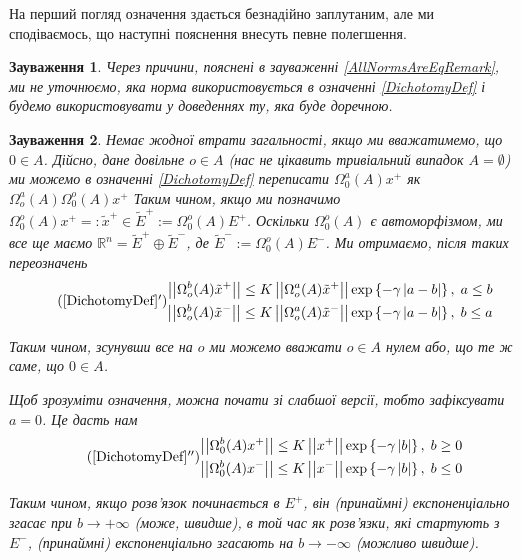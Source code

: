 \documentclass[14pt]{extarticle} %
\newcommand{\mynorm}[1]{\left|\left|#1\right|\right|}
\newcommand{\myabs}[1]{\left|#1\right|}
\newtheorem{remark}{Зауваження}
\begin{document}
На перший погляд означення здається безнадійно заплутаним, але ми сподіваємось, що наступні пояснення внесуть певне полегшення.
\begin{remark}
	Через причини, пояснені в зауваженні \ref{AllNormsAreEqRemark}, ми не уточнюємо, яка норма використовується в означенні
	\ref{DichotomyDef} і будемо використовувати у доведеннях ту, яка буде доречною.
\end{remark}
\begin{remark}
Немає жодної втрати загальності, якщо ми вважатимемо, що $0\in A$. Дійсно, дане довільне $o\in A$ (нас не цікавить тривіальний
випадок $A=\emptyset$) ми можемо в означенні \ref{DichotomyDef} переписати $\Omega_0^a(A)x^+$ як $\Omega_o^a(A)\Omega_0^o(A)x^+$
Таким чином, якщо ми позначимо $\Omega_0^o(A)x^+=:\tilde{x}^+\in \tilde{E}^+:=\Omega_0^o(A)E^+$. Оскільки $\Omega_0^o(A)$ є автоморфізмом,
ми все ще маємо $\mathbb{R}^n=\tilde{E}^+\oplus \tilde{E}^-$, де $\tilde{E}^-:=\Omega_0^o(A)E^-$. Ми отримаємо, після таких переозначень
\begin{equation*}
	\tag{\ref*{DichotomyDef}$'$}
	\begin{aligned}
	\mynorm{\Omega^b_o(A)\tilde{x}^+}\leq K\mynorm{\Omega_o^a(A)\tilde{x}^+}\exp\left\{-\gamma\myabs{a-b}\right\},\;a\leq b\\
	\mynorm{\Omega^b_o(A)\tilde{x}^-}\leq K\mynorm{\Omega_o^a(A)\tilde{x}^-}\exp\left\{-\gamma\myabs{a-b}\right\},\;b\leq a\\
\end{aligned}\end{equation*}

Таким чином, зсунувши все на $o$ ми можемо вважати $o\in A$ нулем або, що те ж саме, що $0\in A$.

Щоб зрозуміти означення, можна почати зі слабшої версії, тобто зафіксувати $a=0$. Це дасть нам
\begin{equation*}
	\tag{\ref*{DichotomyDef}$''$}
	\begin{aligned}
	\mynorm{\Omega^b_0(A){x}^+}\leq K\mynorm{{x}^+}\exp\left\{-\gamma\myabs{b}\right\},\; b\geq 0\\
	\mynorm{\Omega^b_0(A){x}^-}\leq K\mynorm{{x}^-}\exp\left\{-\gamma\myabs{b}\right\},\;b\leq 0\\
\end{aligned}\end{equation*}

Таким чином, якщо розв’язок починається в $E^+$, він (принаймні)
експоненціально
згасає при $b\to+\infty$ (може, швидше), в той час як розв’язки, які стартують з $E^-$,
(принаймні) експоненціально згасають на $b\to-\infty$ (можливо швидше).


\end{remark}
\end{document}
